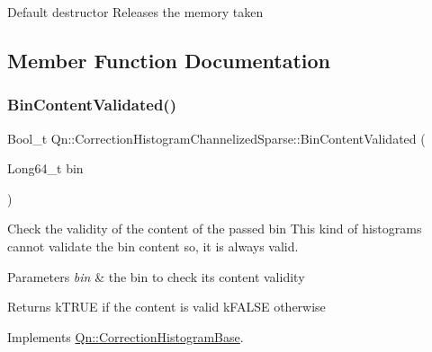 Default destructor Releases the memory taken 

\subsection{Member Function Documentation}
\mbox{\label{classQn_1_1CorrectionHistogramChannelizedSparse_a46f0289fe5ddd088356679486d8376d6}} 
\subsubsection{\texorpdfstring{Bin\+Content\+Validated()}{BinContentValidated()}}
{\footnotesize\ttfamily Bool\+\_\+t Qn\+::\+Correction\+Histogram\+Channelized\+Sparse\+::\+Bin\+Content\+Validated (\begin{DoxyParamCaption}\item[{Long64\+\_\+t}]{bin }\end{DoxyParamCaption})\hspace{0.3cm}{\ttfamily [virtual]}}

Check the validity of the content of the passed bin This kind of histograms cannot validate the bin content so, it is always valid. 
\begin{DoxyParams}{Parameters}
{\em bin} & the bin to check its content validity \\
\hline
\end{DoxyParams}
\begin{DoxyReturn}{Returns}
k\+T\+R\+UE if the content is valid k\+F\+A\+L\+SE otherwise 
\end{DoxyReturn}


Implements \mbox{\hyperlink{classQn_1_1CorrectionHistogramBase_a4db2c92ceaffefaa91475a721612d80d}{Qn\+::\+Correction\+Histogram\+Base}}.

\mbox{\label{classQn_1_1CorrectionHistogramChannelizedSparse_af17e3d8de269e5e3f620ccc5896b06b3}} 
